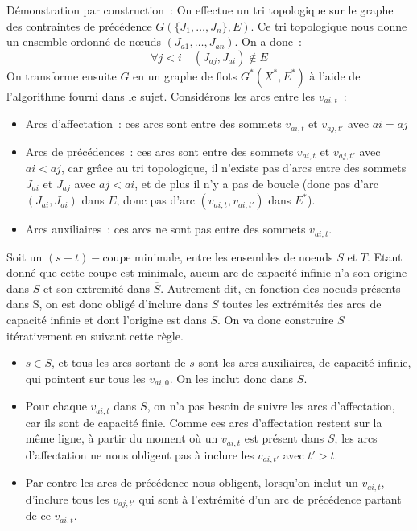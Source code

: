 \documentclass{article}
\begin{document}
Démonstration par construction~: 
On effectue un tri topologique sur le graphe des contraintes de précédence $G(\{J_1, \dots, J_n\}, E)$. Ce tri topologique nous donne un
ensemble ordonné de n\oe uds $(J_{a1}, \dots, J_{an})$. On a donc~:
$$\forall j < i \quad (J_{aj}, J_{ai}) \not\in E$$
On transforme ensuite $G$ en un graphe de flots $G^*(X^*,E^*)$ à l'aide de l'algorithme fourni dans le sujet. 
Considérons les arcs entre les $v_{ai,t}$~: 
\begin{itemize}
	\item Arcs d'affectation~: ces arcs sont entre des sommets $v_{ai,t}$ et $v_{aj,t'}$ avec $ai = aj$
	\item Arcs de précédences~: ces arcs sont entre des sommets $v_{ai,t}$ et $v_{aj,t'}$ avec $ai < aj$, car grâce au tri topologique, il
      n'existe pas d'arcs entre des sommets $J_{ai}$ et $J_{aj}$ avec $aj < ai$, et de plus il n'y a pas de boucle (donc pas d'arc
      $(J_{ai},J_{ai})$ dans $E$, donc pas d'arc $(v_{ai,t}, v_{ai,t'})$ dans $E^*$).
	\item Arcs auxiliaires~: ces arcs ne sont pas entre des sommets $v_{ai,t}$.
\end{itemize}

Soit un $(s-t)-\mathrm{coupe}$ minimale, entre les ensembles de noeuds $S$ et $T$. Etant donné que cette coupe est minimale, aucun arc de
capacité infinie n'a son origine dans $S$ et son extremité dans $\overline{S}$. Autrement dit, en fonction des noeuds présents dans S, on
est donc \og obligé\fg{} d'inclure dans $S$ toutes les extrémités des arcs de capacité infinie et dont l'origine est dans $S$. On va donc
construire $S$ itérativement en suivant cette règle.

\begin{itemize}
\item $s \in S$, et tous les arcs sortant de $s$ sont les arcs auxiliaires, de capacité infinie, qui pointent sur tous les $v_{ai,0}$. On
  les inclut donc dans $S$.
\item Pour chaque $v_{ai,t}$ dans $S$, on n'a pas besoin de suivre les arcs d'affectation, car ils sont de capacité finie. Comme ces arcs
  d'affectation \og restent sur la même ligne\fg, à partir du moment où un $v_{ai,t}$ est présent dans $S$, les arcs d'affectation ne nous
  obligent pas à inclure les $v_{ai,t'}$ avec $t' > t$.
\item Par contre les arcs de précédence nous obligent, lorsqu'on inclut un $v_{ai,t}$, d'inclure tous les $v_{aj,t'}$ qui sont à l'extrémité
  d'un arc de précédence partant de ce $v_{ai,t}$.
\end{itemize}
\end{document}
